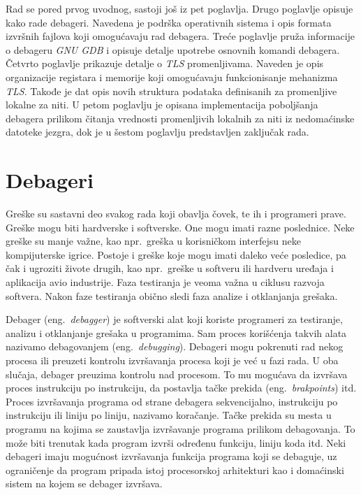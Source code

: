 \documentclass[12pt,oneside]{memoir}
\begin{document}
Rad se pored prvog uvodnog, sastoji još iz pet poglavlja. Drugo poglavlje opisuje kako rade debageri. Navedena je podrška operativnih sistema i opis formata izvršnih fajlova koji omogućavaju rad debagera. Treće poglavlje pruža informacije o debageru \emph{GNU GDB} i opisuje detalje upotrebe osnovnih komandi debagera. Četvrto poglavlje prikazuje detalje o \emph{TLS} promenljivama. Naveden je opis organizacije registara i memorije koji omogućavaju funkcionisanje mehanizma \emph{TLS}. Takođe je dat opis novih struktura podataka definisanih za promenljive lokalne za niti. U petom poglavlju je opisana implementacija poboljšanja debagera prilikom čitanja vrednosti promenljivih lokalnih za niti iz nedomaćinske datoteke jezgra, dok je u šestom poglavlju predstavljen zaključak rada.



\chapter{Debageri}
\label{chp:debageri}

Greške su sastavni deo svakog rada koji obavlja čovek, te ih i programeri prave. Greške mogu biti hardverske i softverske. One mogu imati razne poslednice. Neke greške su manje važne, kao npr.~greška u korisničkom interfejsu neke kompijuterske igrice. Postoje i greške koje mogu imati daleko veće posledice, pa čak i ugroziti živote drugih, kao npr.~greške u softveru ili hardveru uređaja i aplikacija avio industrije. Faza testiranja je veoma važna u ciklusu razvoja softvera. Nakon faze testiranja obično sledi faza analize i otklanjanja grešaka.

Debager (eng.~\emph{debagger}) je softverski alat koji koriste programeri za testiranje, analizu i otklanjanje grešaka u programima. Sam proces korišćenja takvih alata nazivamo debagovanjem (eng.~\emph{debugging}).
Debageri mogu pokrenuti rad nekog procesa ili preuzeti kontrolu izvršavanja procesa koji je već u fazi rada. U oba slučaja, debager preuzima kontrolu nad procesom. To mu mogućava da izvršava proces instrukciju po instrukciju, da postavlja tačke prekida (eng.~\emph{brakpoints}) itd. Proces izvršavanja programa od strane debagera sekvencijalno, instrukciju po instrukciju ili liniju po liniju, nazivamo koračanje. Tačke prekida su mesta u programu na kojima se zaustavlja izvršavanje programa prilikom debagovanja. To može biti trenutak kada program izvrši određenu funkciju, liniju koda itd. Neki debageri imaju mogućnost izvršavanja funkcija programa koji se debaguje, uz ograničenje da program pripada istoj procesorskoj arhitekturi kao i domaćinski sistem na kojem se debager izvršava.
\end{document}
